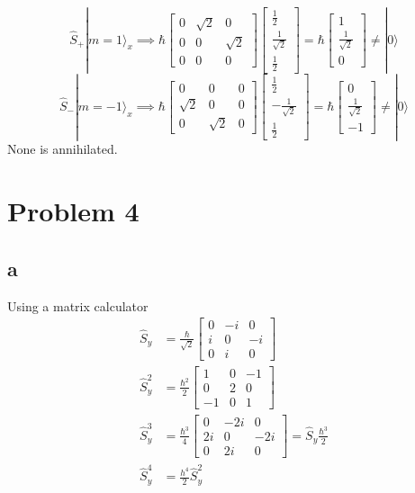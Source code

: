 \documentclass[letter]{article}
\newcommand{\hb}{\hbar}
\begin{document}
\[
\hat{S}_+ | m = 1 \rangle _x \implies 
\hb 
\begin{bmatrix} 0 & \sqrt{2} & 0 \\ 0 & 0 & \sqrt{2}  \\ 0 & 0 & 0  \end{bmatrix} 
\begin{bmatrix} \frac{1}{2} \\ \frac{1}{\sqrt{2} } \\ \frac{1}{2} \end{bmatrix}  = 
\hb \begin{bmatrix} 1 \\ \frac{1}{\sqrt{2} } \\ 0 \end{bmatrix}  \neq | 0 \rangle 
\]
\[
	\hat{S}_- | m = -1 \rangle _x \implies 
\hb 
\begin{bmatrix} 0 & 0 & 0 \\ \sqrt{2} & 0 & 0 \\ 0 & \sqrt{2}  & 0  \end{bmatrix} 
\begin{bmatrix} \frac{1}{2} \\ - \frac{1}{\sqrt{2} } \\ \frac{1}{2} \end{bmatrix} = 
\hb 
\begin{bmatrix} 0 \\ \frac{1}{\sqrt{2} } \\ -1 \end{bmatrix}  \neq | 0 \rangle 
\] 
None is annihilated. 

\section*{Problem 4} 
\subsection*{a}
Using a matrix calculator
\begin{align*}
	\hat{S}_y &= \frac{\hb }{\sqrt{2}} 
	\begin{bmatrix} 0 & -i & 0 \\ i & 0 & -i \\ 0 & i & 0 \end{bmatrix}  \\ 
	\hat{S}_y ^2 &= \frac{\hb^2}{2} 
	\begin{bmatrix} 1 & 0 & -1 \\ 0 & 2 & 0 \\ -1 & 0 & 1 \end{bmatrix} 
	\\ 
	\hat{S}_y ^3 &=  
	\frac{\hb ^3}{4}
	\begin{bmatrix} 0 & -2i & 0 \\ 2i & 0 & -2i \\ 0 & 2i & 0 \end{bmatrix}  = 
	\hat{S}_y \frac{\hb ^3}{2}
	\\ 
	\hat{S}_y ^{4}& = \frac{h^{4}}{2} \hat{S}_y^2 
\end{align*}
\end{document}
